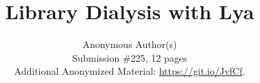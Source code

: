 \documentclass[letterpaper,twocolumn,10pt]{article}
\begin{document}

\date{}

\title{\Large \bf Library Dialysis with Lya}

\author{
{\rm Anonymous Author(s)}\\
\normalsize{Submission \#225, 12 pages}\\
\normalsize{Additional Anonymized Material: \href{https://git.io/JvfCf}{https://git.io/JvfCf}.}
}

\maketitle
\end{document}
